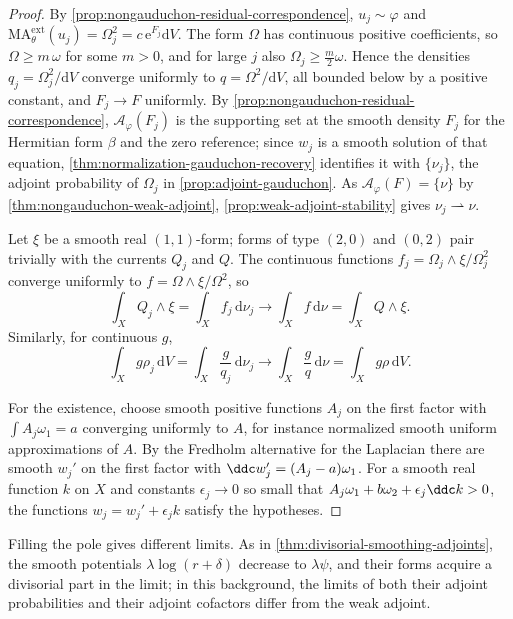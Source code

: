 \begin{proof}
By \cref{prop:nongauduchon-residual-correspondence}, $u_j\sim\varphi$ and $\mathrm{MA}^{\mathrm{ext}}_\theta(u_j)=\Omega_j^2=c\,\mathrm e^{F_j}\mathrm dV$. The form $\Omega$ has continuous positive coefficients, so $\Omega\geq m\,\omega$ for some $m>0$, and for large $j$ also $\Omega_j\geq\frac m2\omega$. Hence the densities $q_j=\Omega_j^2/\mathrm dV$ converge uniformly to $q=\Omega^2/\mathrm dV$, all bounded below by a positive constant, and $F_j\to F$ uniformly. By \cref{prop:nongauduchon-residual-correspondence}, $\mathcal A_\varphi(F_j)$ is the supporting set at the smooth density $F_j$ for the Hermitian form $\beta$ and the zero reference; since $w_j$ is a smooth solution of that equation, \cref{thm:normalization-gauduchon-recovery} identifies it with $\{\nu_j\}$, the adjoint probability of $\Omega_j$ in \cref{prop:adjoint-gauduchon}. As $\mathcal A_\varphi(F)=\{\nu\}$ by \cref{thm:nongauduchon-weak-adjoint}, \cref{prop:weak-adjoint-stability} gives $\nu_j\rightharpoonup\nu$.

Let $\xi$ be a smooth real $(1,1)$-form; forms of type $(2,0)$ and $(0,2)$ pair trivially with the currents $Q_j$ and $Q$. The continuous functions $f_j=\Omega_j\wedge\xi/\Omega_j^2$ converge uniformly to $f=\Omega\wedge\xi/\Omega^2$, so
\[
 \int_XQ_j\wedge\xi=\int_Xf_j\,\mathrm d\nu_j\longrightarrow\int_Xf\,\mathrm d\nu=\int_XQ\wedge\xi.
\]
Similarly, for continuous $g$,
\[
 \int_Xg\rho_j\,\mathrm dV=\int_X\frac g{q_j}\,\mathrm d\nu_j
 \longrightarrow\int_X\frac gq\,\mathrm d\nu=\int_Xg\rho\,\mathrm dV.
\]

For the existence, choose smooth positive functions $A_j$ on the first factor with $\int A_j\omega_1=a$ converging uniformly to $A$, for instance normalized smooth uniform approximations of $A$. By the Fredholm alternative for the Laplacian there are smooth $w_j'$ on the first factor with $\ddc w_j'=(A_j-a)\omega_1$. For a smooth real function $k$ on $X$ and constants $\epsilon_j\to0$ so small that $A_j\omega_1+b\omega_2+\epsilon_j\ddc k>0$, the functions $w_j=w_j'+\epsilon_jk$ satisfy the hypotheses.
\end{proof}

Filling the pole gives different limits. As in \cref{thm:divisorial-smoothing-adjoints}, the smooth potentials $\lambda\log(r+\delta)$ decrease to $\lambda\psi$, and their forms acquire a divisorial part in the limit; in this background, the limits of both their adjoint probabilities and their adjoint cofactors differ from the weak adjoint.

